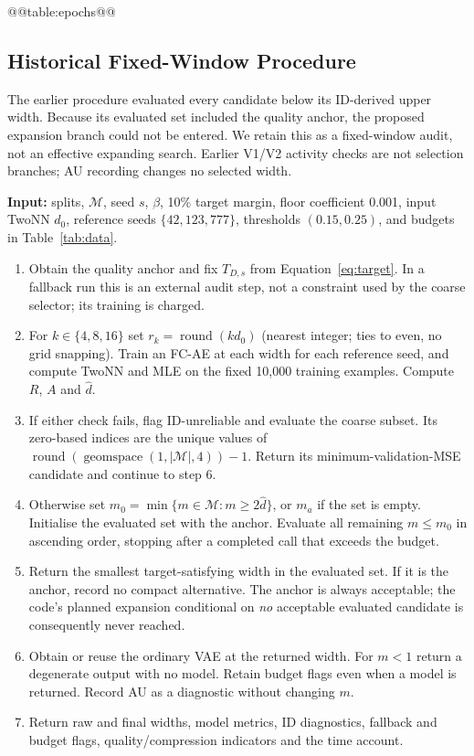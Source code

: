 @@table:epochs@@

\subsection{Historical Fixed-Window Procedure}\label{app:legacy}
The earlier procedure evaluated every candidate below its ID-derived
upper width. Because its evaluated set included the quality anchor,
the proposed expansion branch could not be entered. We retain this as
a fixed-window audit, not an effective expanding search. Earlier V1/V2
activity checks are not selection branches; AU recording changes no
selected width.

\noindent\begin{minipage}{\linewidth}
\begin{Algorithm}
\label{alg:legacy}\normalfont\small\leavevmode\par\noindent
\textbf{Input:} splits, $\mathcal M$, seed $s$, $\beta$, 10\% target margin,
floor coefficient 0.001, input TwoNN $d_0$, reference seeds
$\{42,123,777\}$, thresholds $(0.15,0.25)$, and budgets in Table~\ref{tab:data}.
\begin{enumerate}
\item Obtain the quality anchor and fix $T_{D,s}$ from
Equation~\eqref{eq:target}. In a fallback run this is an external audit
step, not a constraint used by the coarse selector; its training is charged.
\item For $k\in\{4,8,16\}$ set $r_k=\operatorname{round}(kd_0)$
(nearest integer; ties to even, no grid snapping). Train an FC-AE at each
width for each reference seed, and compute TwoNN and MLE on the fixed
10,000 training examples. Compute $R$, $A$ and $\hat d$.
\item If either check fails, flag ID-unreliable and evaluate the coarse
subset. Its zero-based indices are the unique values of
$\operatorname{round}(\operatorname{geomspace}(1,|\mathcal M|,4))-1$.
Return its minimum-validation-MSE candidate and continue to step 6.
\item Otherwise set $m_0=\min\{m\in\mathcal M:m\ge2\hat d\}$,
or $m_a$ if the set is empty. Initialise the evaluated set with the
anchor. Evaluate all remaining $m\le m_0$ in ascending order, stopping
after a completed call that exceeds the budget.
\item Return the smallest target-satisfying width in the evaluated set.
If it is the anchor, record no compact alternative. The anchor is always
acceptable; the code's planned expansion conditional on \emph{no}
acceptable evaluated candidate is consequently never reached.
\item Obtain or reuse the ordinary VAE at the returned width. For
$m<1$ return a degenerate output with no model. Retain budget flags even
when a model is returned. Record AU as a diagnostic without changing $m$.
\item Return raw and final widths, model metrics, ID diagnostics,
fallback and budget flags, quality/compression indicators and the time account.
\end{enumerate}
\end{Algorithm}
\end{minipage}

